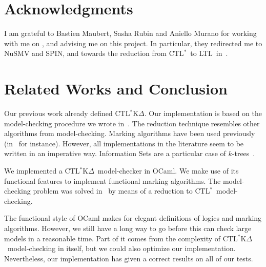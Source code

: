 \documentclass[dvipsnames]{acmart}
\def\ctls{CTL$^{*}$}
\def\ctlskd{CTL$^{*}$K$\Delta$}
\def\ltl{LTL}
\begin{document}
\section{Acknowledgments}
I am grateful to Bastien Maubert, Sasha Rubin and Aniello Murano for working with me on \cite{internship,KR18}, and advising me on this project.
In particular, they redirected me to NuSMV and SPIN, and towards the reduction from \ctls\ to \ltl\ in~\cite{reduction}.

\section{Related Works and Conclusion}
Our previous work already defined \ctlskd. Our implementation is based on the model-checking procedure we wrote in~\cite{internship}.
The reduction technique resembles other algorithms from model-checking.
Marking algorithms have been used previously (in~\cite{reduction} for instance).
However, all implementations in the literature seem to be written in an imperative way.
Information Sets are a particular case of $k$-trees~\cite{ktrees}.

We implemented a \ctlskd\ model-checker in OCaml. We make use of its functional features to implement functional marking algorithms. The model-checking problem was solved in~\cite{internship} by means of a reduction to \ctls\ model-checking. 

The functional style of OCaml makes for elegant definitions of logics and marking algorithms. However, we still have a long way to go before this can check large models in a reasonable time. Part of it comes from the complexity of \ctlskd\ model-checking in itself, but we could also optimize our implementation.
Nevertheless, our implementation has given a correct results on all of our tests.

\newpage


\end{document}
